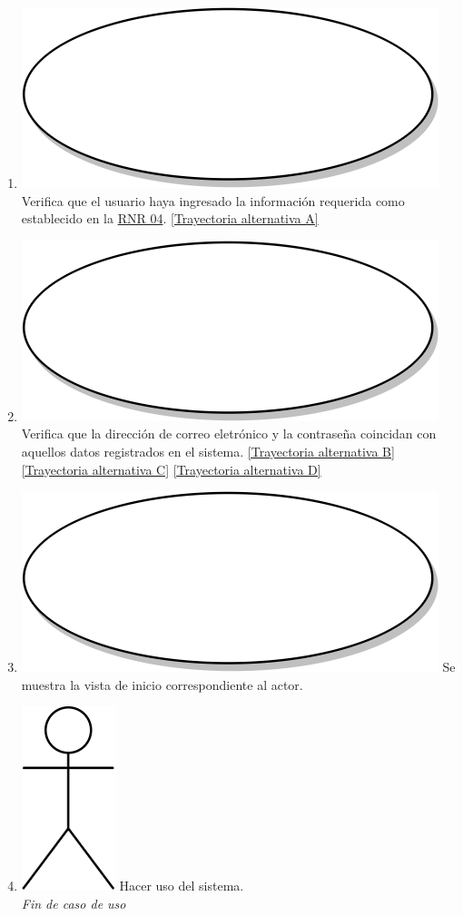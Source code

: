 \begin{enumerate}
  \item {\includegraphics[scale=.05]{Capitulo3/img/proceso.png} Verifica que el usuario haya ingresado la información requerida como establecido en la \hyperref[rnl_04]{RNR 04}. \hyperref[cu1_ta_a]{[Trayectoria alternativa A]}}
  \item {\includegraphics[scale=.05]{Capitulo3/img/proceso.png} Verifica que la dirección de correo eletrónico y la contraseña coincidan con aquellos datos registrados en el sistema. \hyperref[cu1_ta_b]{[Trayectoria alternativa B]} \hyperref[cu1_ta_c]{[Trayectoria alternativa C]} \hyperref[cu1_ta_d]{[Trayectoria alternativa D]}}
  \item {\includegraphics[scale=.05]{Capitulo3/img/proceso.png} Se muestra la vista de inicio correspondiente al actor.}
  \item {\includegraphics[scale=.1]{Capitulo3/img/actor.png} Hacer uso del sistema.}\\
  \textit{Fin de caso de uso} \\	
\end{enumerate}


